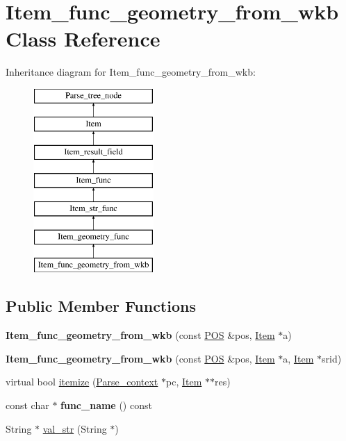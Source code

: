 \hypertarget{classItem__func__geometry__from__wkb}{}\section{Item\+\_\+func\+\_\+geometry\+\_\+from\+\_\+wkb Class Reference}
\label{classItem__func__geometry__from__wkb}
Inheritance diagram for Item\+\_\+func\+\_\+geometry\+\_\+from\+\_\+wkb\+:\begin{figure}[H]
\begin{center}
\leavevmode
\includegraphics[height=7.000000cm]{classItem__func__geometry__from__wkb}
\end{center}
\end{figure}
\subsection*{Public Member Functions}
\begin{DoxyCompactItemize}
\item 
\mbox{\label{classItem__func__geometry__from__wkb_aa33c22018dfe0741c382dcb43e4f2205}} 
{\bfseries Item\+\_\+func\+\_\+geometry\+\_\+from\+\_\+wkb} (const \mbox{\hyperlink{structYYLTYPE}{P\+OS}} \&pos, \mbox{\hyperlink{classItem}{Item}} $\ast$a)
\item 
\mbox{\label{classItem__func__geometry__from__wkb_aa3de3aa2219eba34c4b53a3d8efa5ea5}} 
{\bfseries Item\+\_\+func\+\_\+geometry\+\_\+from\+\_\+wkb} (const \mbox{\hyperlink{structYYLTYPE}{P\+OS}} \&pos, \mbox{\hyperlink{classItem}{Item}} $\ast$a, \mbox{\hyperlink{classItem}{Item}} $\ast$srid)
\item 
virtual bool \mbox{\hyperlink{classItem__func__geometry__from__wkb_a5bbf72a1bfa89ffeb1b6b50691a661b4}{itemize}} (\mbox{\hyperlink{structParse__context}{Parse\+\_\+context}} $\ast$pc, \mbox{\hyperlink{classItem}{Item}} $\ast$$\ast$res)
\item 
\mbox{\label{classItem__func__geometry__from__wkb_a76355fc6250e91fff5b9923645f93961}} 
const char $\ast$ {\bfseries func\+\_\+name} () const
\item 
String $\ast$ \mbox{\hyperlink{classItem__func__geometry__from__wkb_ac1baee59e93751fb2b17f742bbcd183e}{val\+\_\+str}} (String $\ast$)
\end{DoxyCompactItemize}
